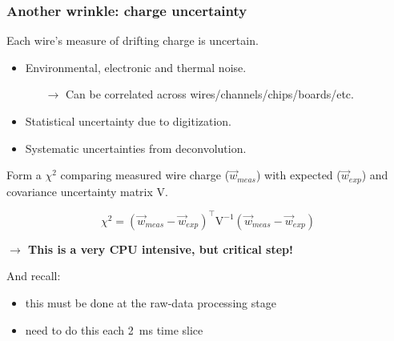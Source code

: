 \begin{frame}
  \frametitle{Another wrinkle: charge uncertainty}

  Each wire's measure of drifting charge is uncertain.
  \begin{itemize}
  \item Environmental, electronic and thermal noise.
    \begin{itemize}\footnotesize
    \item[$\rightarrow$] Can be correlated across wires/channels/chips/boards/etc.
    \end{itemize}
  \item Statistical uncertainty due to digitization.
  \item Systematic uncertainties from deconvolution.
  \end{itemize}

  \vspace{3mm}

  Form a $\chi^2$ comparing measured wire charge ($\vec{w}_{meas}$)
  with expected ($\vec{w}_{exp}$) and covariance uncertainty matrix
  $\mathrm{V}$.
  
  \[\chi^2 = (\vec{w}_{meas}-\vec{w}_{exp})^\intercal\mathrm{V}^{-1} (\vec{w}_{meas}-\vec{w}_{exp})\]

  \vspace{3mm}

  \begin{center}
    \textbf{$\rightarrow$ This is a very CPU intensive, but critical step!}
  \end{center}

  \footnotesize And recall:
  \begin{itemize}
  \item this must be done at the raw-data processing stage
  \item need to do this each \SI{2}{\milli\second} time slice
  \end{itemize}

\end{frame}

